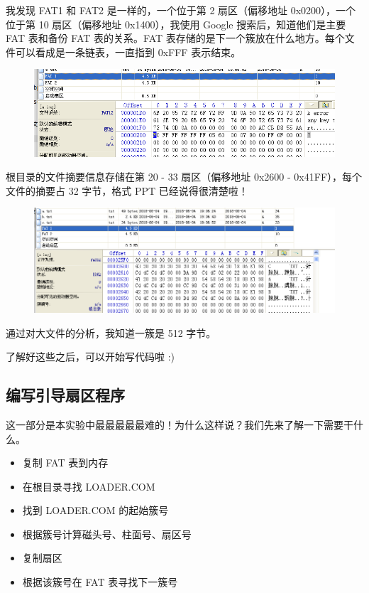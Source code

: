 \documentclass[a4paper]{article}
\begin{document}
我发现 FAT1 和 FAT2 是一样的，一个位于第 2 扇区（偏移地址 0x0200），一个位于第 10 扇区（偏移地址 0x1400），我使用 Google 搜索后，知道他们是主要 FAT 表和备份 FAT 表的关系。FAT 表存储的是下一个簇放在什么地方。每个文件可以看成是一条链表，一直指到 0xFFF 表示结束。

\begin{figure}[!hbp]
\centering
\includegraphics[scale=0.5]{pics/6.png}
\end{figure}

根目录的文件摘要信息存储在第 20 - 33 扇区（偏移地址 0x2600 - 0x41FF），每个文件的摘要占 32 字节，格式 PPT 已经说得很清楚啦！

\begin{figure}[!hbp]
\centering
\includegraphics[scale=0.5]{pics/7.png}
\end{figure}

通过对大文件的分析，我知道一簇是 512 字节。

了解好这些之后，可以开始写代码啦 :)

\subsection{编写引导扇区程序}

这一部分是本实验中最最最最最难的！为什么这样说？我们先来了解一下需要干什么。

\begin{itemize}
\item 复制 FAT 表到内存
\item 在根目录寻找 LOADER.COM 
\item 找到 LOADER.COM 的起始簇号
\item 根据簇号计算磁头号、柱面号、扇区号
\item 复制扇区
\item 根据该簇号在 FAT 表寻找下一簇号
\end{itemize}
\end{document}
